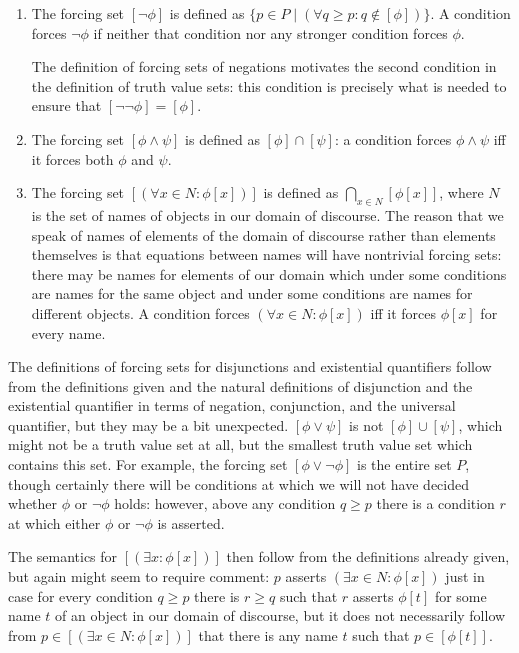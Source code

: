 \documentclass[12pt]{book}
\begin{document}
\begin{description}
\begin{enumerate}

\item The forcing set $[\neg \phi]$ is defined as $\{p \in P\mid (\forall q \geq p:q \not\in [\phi])\}$.  A condition forces $\neg \phi$ if neither that condition nor any stronger condition forces $\phi$.

The definition of forcing sets of negations motivates the second condition in the definition of truth value sets:  this condition is precisely what is needed to ensure that $[\neg \neg \phi] = [\phi]$.

\item The forcing set $[\phi \wedge \psi]$ is defined as $[\phi] \cap [\psi]$:  a condition forces $\phi \wedge \psi$ iff it forces both $\phi$ and $\psi$.

\item The forcing set $[(\forall x \in N:\phi[x])]$ is defined as $\bigcap_{x \in N}[\phi[x]]$, where $N$ is the set of names of objects in our domain of discourse.  The reason that we speak of names of elements of the domain of discourse rather than elements themselves is that equations between names will have nontrivial forcing sets:  there may be names for elements of our domain which under some conditions are names for the same object and under some conditions are names for different objects.  A condition forces $(\forall x \in N:\phi[x])$ iff it forces $\phi[x]$ for every name.

\end{enumerate}

\end{description}

The definitions of forcing sets for disjunctions and existential quantifiers follow from the definitions given and the natural definitions 
of disjunction and the existential quantifier in terms of negation, conjunction, and the universal quantifier, but they may be a bit unexpected.
$[\phi \vee \psi]$ is not $[\phi] \cup [\psi]$, which might not be a truth value set at all, but the smallest truth value set which contains this set.
For example, the forcing set $[\phi \vee \neg \phi]$ is  the entire set $P$, though certainly there will be conditions at which we will not have decided whether $\phi$ or $\neg\phi$ holds:  however, above any condition $q \geq p$ there is a condition $r$ at which either $\phi$ or $\neg \phi$ is asserted.

The semantics for $[(\exists x:\phi[x])]$ then follow from the definitions already given, but again might seem to require comment:  $p$ asserts
$(\exists x \in N:\phi[x])$ just in case for every condition $q \geq p$ there is $r \geq q$ such that $r$ asserts $\phi[t]$ for some name $t$ of an object in our domain of discourse, but it does not necessarily follow from $p \in [(\exists x \in N:\phi[x])]$ that there is any name $t$ such that $p \in [\phi[t]]$.
\end{document}
